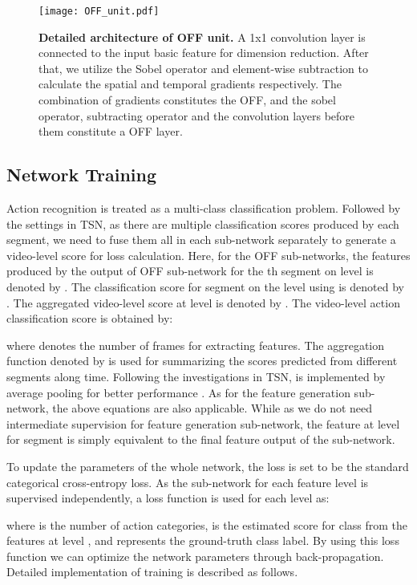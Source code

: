 \documentclass[10pt,twocolumn,letterpaper]{article}
\begin{document}
\begin{figure}[t]
\centering
\texttt{[image: OFF\_unit.pdf]}
\caption{\textbf{Detailed architecture of OFF unit.} A 1x1 convolution layer is connected to the input basic feature for dimension reduction. After that, we utilize the Sobel operator and element-wise subtraction to calculate the spatial and temporal gradients respectively. The combination of gradients constitutes the OFF, and the sobel operator, subtracting operator and the  convolution layers before them constitute a OFF layer.}
\label{fig:fag}
\end{figure}

\vspace{-8px}
\subsection{Network Training}
Action recognition is treated as a multi-class classification problem. 
Followed by the settings in TSN, as there are multiple classification scores produced by each segment, we need to fuse them all in each sub-network separately to generate a video-level score for loss calculation. Here, for the OFF sub-networks, the features produced by the output of OFF sub-network for the th segment on level  is denoted by . The classification score for segment  on the level  using  is denoted by . The aggregated video-level score at level  is denoted by . The video-level action classification score  is obtained by:

where  denotes the number of frames for extracting features. The aggregation function denoted by  is used for summarizing the scores predicted from different segments along time. Following the investigations in TSN,  is implemented by average pooling for better performance \cite{wang2016tsn}. As for the feature generation sub-network, the above equations are also applicable. While as we do not need intermediate supervision for feature generation sub-network, the feature  at level  for segment  is simply equivalent to the final feature output of the sub-network.

To update the parameters of the whole network, the loss is set to be the standard categorical cross-entropy loss. As the sub-network for each feature level is supervised independently, a loss function is used for each level as:

where  is the number of action categories,  is the estimated score for class  from the features at level , and  represents the ground-truth class label.
By using this loss function we can optimize the network parameters through back-propagation. Detailed implementation of training is described as follows.
\end{document}
